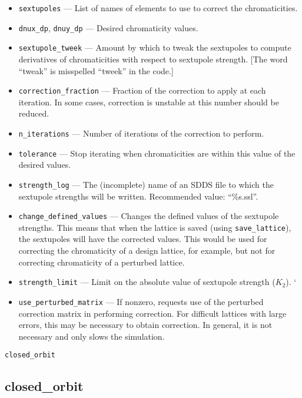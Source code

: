 \documentclass[11pt]{article}
\begin{document}
\begin{itemize}
\item \verb|sextupoles| --- List of names of elements to use to correct the chromaticities.
\item \verb|dnux_dp|, \verb|dnuy_dp| --- Desired chromaticity values.
\item \verb|sextupole_tweek| --- Amount by which to tweak the sextupoles to compute derivatives of
chromaticities with respect to sextupole strength.  [The word ``tweak'' is misspelled ``tweek'' in the code.]
\item \verb|correction_fraction| --- Fraction of the correction to apply at each iteration.  In some
cases, correction is unstable at this number should be reduced.
\item \verb|n_iterations| --- Number of iterations of the correction to perform.
\item \verb|tolerance| --- Stop iterating when chromaticities are within this value of the
desired values.
\item \verb|strength_log| --- The (incomplete) name of an SDDS file to which the sextupole strengths will
be written.  Recommended value: ``\%s.ssl''.
\item \verb|change_defined_values| --- Changes the defined values of the sextupole strengths.
This means that when the lattice is saved (using \verb|save_lattice|), the sextupoles will
have the corrected values.  This would be used for correcting the chromaticity of a design
lattice, for example, but not for correcting chromaticity of a perturbed lattice.
\item \verb|strength_limit| --- Limit on the absolute value of sextupole strength ($K_2$).
`\item \verb|use_perturbed_matrix| --- If nonzero, requests use of the perturbed correction matrix in
performing correction.  For difficult lattices with large errors, this may be necessary
to obtain correction.  In general, it is not necessary and only slows the simulation.
\end{itemize}

\begin{latexonly}
\newpage
\begin{center}{\Large\verb|closed_orbit|}\end{center}
\end{latexonly}
\subsection{closed\_orbit \label{subsec:closedorbit}}
\end{document}
